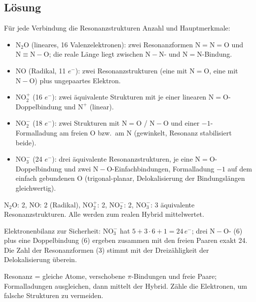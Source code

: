 
\subsection*{Lösung}
Für jede Verbindung die Resonanzstrukturen {Anzahl und Hauptmerkmale}:
\begin{itemize}
  \item \textbf{$\mathrm{N_2O}$} (lineares, 16 Valenzelektronen): zwei
        Resonanzformen        $\mathrm{N=N=O}$ und $\mathrm{N\equiv N-O}$; die
        reale Länge liegt zwischen $\mathrm{N-N}$- und $\mathrm{N=N}$-Bindung.
  \item \textbf{$\mathrm{NO}$} (Radikal, 11 $e^-$): zwei Resonanzstrukturen
        (eine mit $\mathrm{N=O}$, eine mit $\mathrm{N-O}$) plus ungepaartes
        Elektron.
  \item \textbf{$\mathrm{NO_2^+}$} (16 $e^-$): zwei äquivalente Strukturen mit
        je einer linearen $\mathrm{N=O}$-Doppelbindung und $\mathrm{N^+}$
        (linear).
  \item \textbf{$\mathrm{NO_2^-}$} (18 $e^-$): zwei Strukturen mit
        $\mathrm{N=O}$ / $\mathrm{N-O}$ und einer $-1$-Formalladung am
        freien O bzw.\ am N (gewinkelt, Resonanz stabilisiert beide).
  \item \textbf{$\mathrm{NO_3^-}$} (24 $e^-$): drei äquivalente
        Resonanzstrukturen, je eine $\mathrm{N=O}$-Doppelbindung und zwei
        $\mathrm{N-O}$-Einfachbindungen, Formalladung $-1$ auf dem einfach
        gebundenen O (trigonal-planar, Delokalisierung der Bindungslängen
        gleichwertig).
\end{itemize}

\begin{ergebnis}
$\mathrm{N_2O}$: 2, $\mathrm{NO}$: 2 (Radikal), $\mathrm{NO_2^+}$: 2,
$\mathrm{NO_2^-}$: 2, $\mathrm{NO_3^-}$: 3 äquivalente Resonanzstrukturen.
Alle werden zum realen Hybrid mittelwertet.
\end{ergebnis}

\begin{kontrolle}
Elektronenbilanz zur Sicherheit: $\mathrm{NO_3^-}$ hat $5+3\cdot6+1=24\,e^-$;
drei $\mathrm{N-O}$- (6) plus eine Doppelbindung (6) ergeben zusammen mit den
freien Paaren exakt 24. Die Zahl der Resonanzformen (3) stimmt mit der
Dreizähligkeit der Delokalisierung überein.
\end{kontrolle}

\begin{merksatz}
Resonanz = gleiche Atome, verschobene $\pi$-Bindungen und freie Paare;
Formalladungen ausgleichen, dann mittelt der Hybrid. Zähle die Elektronen, um
falsche Strukturen zu vermeiden.
\end{merksatz}
